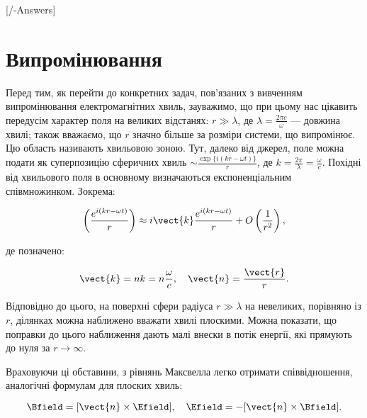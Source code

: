 
[\currfilebase/\currfilebase-Answers]
\chapter{Випромінювання}\label{\currfilebase}


Перед тим, як перейти до конкретних задач, пов’язаних з вивченням випромінювання електромагнітних хвиль, зауважимо, що при цьому нас цікавить передусім
характер поля на великих відстанях: \( r \gg \lambda \), де \( \lambda = \frac{2\pi c}{\omega} \) --- довжина хвилі; також вважаємо, що \( r \) значно
більше за розміри системи, що випромінює. Цю область називають хвильовою зоною. Тут, далеко від джерел, поле можна подати як суперпозицію сферичних
хвиль \( \sim \frac{\exp\{i(kr - \omega t)\}}{r} \), де \( k = \frac{2\pi}{\lambda} = \frac{\omega}{c} \). Похідні від хвильового поля в основному
визначаються експоненціальним співмножинком. Зокрема:

\begin{equation}
	\left( \frac{e^{i(kr - \omega t)}}{r} \right) \approx i\vect{k}  \frac{e^{i(kr - \omega t)}}{r} +O \left(\frac{1}{r^2} \right),
	\label{eq:wave_field}
\end{equation}

де позначено:

\begin{equation}
	\vect{k} = nk = n\frac{\omega}{c}, \quad \vect{n} = \frac{\vect{r}}{r}.
	\label{eq:wave_vector}
\end{equation}

Відповідно до цього, на поверхні сфери радіуса \( r \gg \lambda \) на невеликих, порівняно із \( r \), ділянках можна наближено вважати хвилі плоскими.
Можна показати, що поправки до цього наближення дають малі внески в потік енергії, які прямують до нуля за \( r \to \infty \).

Враховуючи ці обставини, з рівнянь Максвелла легко отримати співвідношення, аналогічні формулам для плоских хвиль:

\begin{equation}
	\Bfield = [\vect{n} \times \Efield], \quad \Efield = -[\vect{n} \times \Bfield].
	\label{eq:maxwell_relations}
\end{equation}

